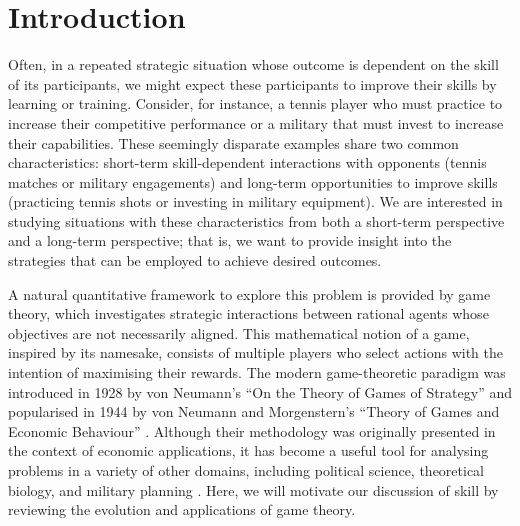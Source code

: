 
\chapter{Introduction} \label{chp:introduction}
    Often, in a repeated strategic situation whose outcome is dependent on the skill of its participants, we might expect these participants to improve their skills by learning or training.
    Consider, for instance, a tennis player who must practice to increase their competitive performance or a military that must invest to increase their capabilities.
    These seemingly disparate examples share two common characteristics: short-term skill-dependent interactions with opponents (tennis matches or military engagements) and long-term opportunities to improve skills (practicing tennis shots or investing in military equipment).
    We are interested in studying situations with these characteristics from both a short-term perspective and a long-term perspective; that is, we want to provide insight into the strategies that can be employed to achieve desired outcomes.

    A natural quantitative framework to explore this problem is provided by game theory, which investigates strategic interactions between rational agents whose objectives are not necessarily aligned.
    This mathematical notion of a game, inspired by its namesake, consists of multiple players who select actions with the intention of maximising their rewards.
    The modern game-theoretic paradigm was introduced in 1928 by von Neumann's ``On the Theory of Games of Strategy'' \parencite{vonNeumann1959} and popularised in 1944 by von Neumann and Morgenstern's ``Theory of Games and Economic Behaviour'' \parencite{vonNeumann2004}.
    Although their methodology was originally presented in the context of economic applications, it has become a useful tool for analysing problems in a variety of other domains, including political science, theoretical biology, and military planning \parencite{Maschler2013}.
    Here, we will motivate our discussion of skill by reviewing the evolution and applications of game theory.

